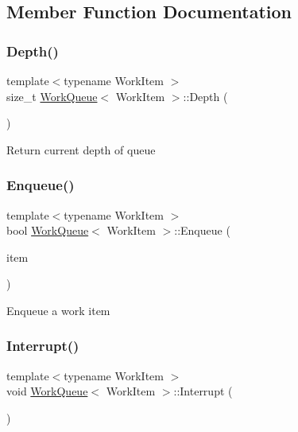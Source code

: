 \subsection{Member Function Documentation}
\mbox{\label{class_work_queue_a03ea7a5a3add5d6e031eb3605d833049}} 
\subsubsection{\texorpdfstring{Depth()}{Depth()}}
{\footnotesize\ttfamily template$<$typename Work\+Item $>$ \\
size\+\_\+t \mbox{\hyperlink{class_work_queue}{Work\+Queue}}$<$ Work\+Item $>$\+::Depth (\begin{DoxyParamCaption}{ }\end{DoxyParamCaption})\hspace{0.3cm}{\ttfamily [inline]}}

Return current depth of queue \mbox{\label{class_work_queue_a1367fb4c1a883108ecd2a44569646920}} 
\subsubsection{\texorpdfstring{Enqueue()}{Enqueue()}}
{\footnotesize\ttfamily template$<$typename Work\+Item $>$ \\
bool \mbox{\hyperlink{class_work_queue}{Work\+Queue}}$<$ Work\+Item $>$\+::Enqueue (\begin{DoxyParamCaption}\item[{Work\+Item $\ast$}]{item }\end{DoxyParamCaption})\hspace{0.3cm}{\ttfamily [inline]}}

Enqueue a work item \mbox{\label{class_work_queue_aaf31577d0f8e5ebd2f153928da45b9b9}} 
\subsubsection{\texorpdfstring{Interrupt()}{Interrupt()}}
{\footnotesize\ttfamily template$<$typename Work\+Item $>$ \\
void \mbox{\hyperlink{class_work_queue}{Work\+Queue}}$<$ Work\+Item $>$\+::Interrupt (\begin{DoxyParamCaption}{ }\end{DoxyParamCaption})\hspace{0.3cm}{\ttfamily [inline]}}

